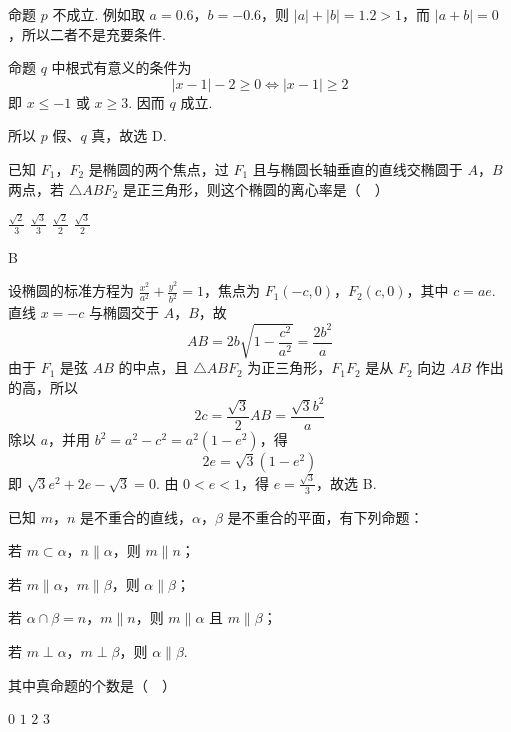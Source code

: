 \begin{solution}
命题 \(p\) 不成立. 例如取 \(a=0.6\)，\(b=-0.6\)，则 \(|a|+|b|=1.2>1\)，而 \(|a+b|=0\)，所以二者不是充要条件.

命题 \(q\) 中根式有意义的条件为
\[
|x-1|-2\geqslant0\Longleftrightarrow |x-1|\geqslant2
\]
即 \(x\leqslant-1\) 或 \(x\geqslant3\).  因而 \(q\) 成立.

所以 \(p\) 假、\(q\) 真，故选 D.
\end{solution}

\begin{problem}
已知 \(F_1\)，\(F_2\) 是椭圆的两个焦点，过 \(F_1\) 且与椭圆长轴垂直的直线交椭圆于 \(A\)，\(B\) 两点，若 \(\triangle ABF_2\) 是正三角形，则这个椭圆的离心率是（\(\quad\)）

\choices
    {\(\frac{\sqrt{2}}{3}\)}
    {\(\frac{\sqrt{3}}{3}\)}
    {\(\frac{\sqrt{2}}{2}\)}
    {\(\frac{\sqrt{3}}{2}\)}
\end{problem}

\begin{answer}B\end{answer}

\begin{solution}
设椭圆的标准方程为 \(\frac{x^2}{a^2}+\frac{y^2}{b^2}=1\)，焦点为 \(F_1(-c,0)\)，\(F_2(c,0)\)，其中 \(c=ae\).  直线 \(x=-c\) 与椭圆交于 \(A\)，\(B\)，故
\[
AB=2b\sqrt{1-\frac{c^2}{a^2}}=\frac{2b^2}{a}
\]
由于 \(F_1\) 是弦 \(AB\) 的中点，且 \(\triangle ABF_2\) 为正三角形，\(F_1F_2\) 是从 \(F_2\) 向边 \(AB\) 作出的高，所以
\[
2c=\frac{\sqrt3}{2}AB=\frac{\sqrt3 b^2}{a}
\]
除以 \(a\)，并用 \(b^2=a^2-c^2=a^2(1-e^2)\)，得
\[
2e=\sqrt3(1-e^2)
\]
即 \(\sqrt3e^2+2e-\sqrt3=0\).  由 \(0<e<1\)，得 \(e=\frac{\sqrt3}{3}\)，故选 B.
\end{solution}

\begin{problem}
已知 \(m\)，\(n\) 是不重合的直线，\(\alpha\)，\(\beta\) 是不重合的平面，有下列命题：

\begin{circlelist}
\item 若 \(m\subset\alpha\)，\(n\parallel\alpha\)，则 \(m\parallel n\)；
\item 若 \(m\parallel\alpha\)，\(m\parallel\beta\)，则 \(\alpha\parallel\beta\)；
\item 若 \(\alpha\cap\beta=n\)，\(m\parallel n\)，则 \(m\parallel\alpha\) 且 \(m\parallel\beta\)；
\item 若 \(m\perp\alpha\)，\(m\perp\beta\)，则 \(\alpha\parallel\beta\).
\end{circlelist}

其中真命题的个数是（\(\quad\)）

\choices
    {\(0\)}
    {\(1\)}
    {\(2\)}
    {\(3\)}
\end{problem}

